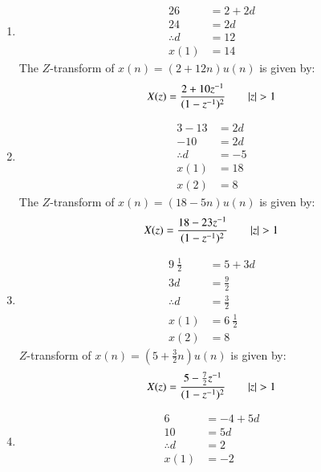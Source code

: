 \documentclass[journal,12pt,twocolumn]{IEEEtran}
\theoremstyle{remark}
\begin{document}
\begin{center}
\begin{enumerate}
    \item  
     \begin{align}
          26&=2+2d\\
        24&=2d \\
        \therefore d&=12\\
         x(1)&=14
     \end{align}
     The $Z$-transform of $x(n) = (2 + 12n)u(n)$ is given by:
     \begin{align}
    X(z)&=\frac{2+{10z^{-1}}}{(1-{z^{-1}})^2} \qquad|z|>1  \notag\\
     \end{align}     
     \item       
      \begin{align}
         3-13&=2d\\
           -10&=2d\\
           \therefore d&=-5\\
            x(1)&=18\\
            x(2)&=8
      \end{align}
     The $Z$-transform of $x(n) = (18 - 5n)u(n)$ is given by:
\begin{align}
    &X(z)=\frac{18-{23z^{-1}}}{(1-{z^{-1}})^2} \qquad  |z|>1  \notag\\
\end{align}
       \item    
     \begin{align}
           9\ \frac{1}{2}\ &=5+3d \\
           3d&=\frac{9}{2}\\
           \therefore d&=\frac{3}{2}\ \\ 
          x(1)&=6\ \frac{1}{2}\\
          x(2)&=8
     \end{align}
     $Z$-transform of $x(n) = (5 + \frac{3}{2}n)u(n)$ is given by:
\begin{align}
    &X(z)=\frac{5-\frac{7}{2}{z^{-1}}}{(1-{z^{-1}})^2} \qquad |z|>1 \notag\\
\end{align}
      \item       
    \begin{align}
     6&=-4+5d\\
     10&=5d\\
     \therefore d&=2\\
          x(1)&=-2\\

\end{align}
\end{enumerate}
\end{center}
\end{document}
